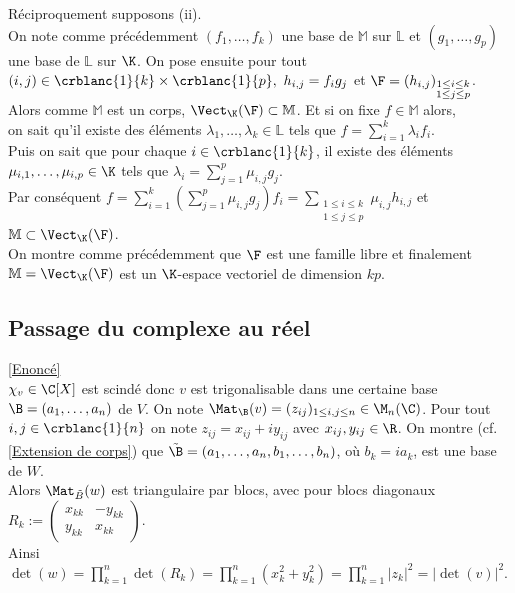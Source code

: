 \documentclass[8pt]{book}
\begin{document}
\begin{enumerate}[leftmargin=*]
		Réciproquement supposons (ii).\\
		On note comme précédemment $(f_1,\dots,f_k)$ une base de $\mathbb M$ sur $\mathbb L$ et $(g_1,\dots,g_p)$ une base de $\mathbb L$ sur $\K$. On pose ensuite pour tout $(i,j)\in \crblanc{1}{k}\times \crblanc{1}{p},\ h_{i,j}=f_ig_j$ et $\F=(h_{i,j})_{\substack{1\leq i\leq k\\1\leq j\leq p}}$. Alors comme $\mathbb M$ est un corps, $\Vect_\K(\F)\subset \mathbb M$. Et si on fixe $f\in \mathbb M$ alors,\\
		on sait qu'il existe des éléments $\lambda_1,\dots,\lambda_k\in \mathbb L$ tels que $f=\displaystyle\sum_{i=1}^k\lambda_if_i$.\\
		Puis on sait que pour chaque $i\in \crblanc{1}{k}$, il existe des éléments $\mu_{i,1},\dots,\mu_{i,p}\in \K$ tels que $\lambda_i=\displaystyle\sum_{j=1}^p\mu_{i,j}g_j$.\\
		Par conséquent $f=\displaystyle\sum_{i=1}^k\left(\sum_{j=1}^p\mu_{i,j}g_j\right)f_i=\sum_{\substack{1\leq i\leq k\\1\leq j\leq p}}\mu_{i,j}h_{i,j}$ et $\mathbb M\subset \Vect_\K(\F)$.\\
		On montre comme précédemment que $\F$ est une famille libre et finalement $\mathbb M=\Vect_\K(\F)$ est un $\K$-espace vectoriel de dimension $kp$.
	\end{enumerate}
	
\subsection{Passage du complexe au réel }
	\textcolor{blue}{\hyperref[Passage du complexe au réel]{[Enoncé]}}\\
	\label{Passage du complexe au réel corrigé}
	$\chi_v\in \C[X]$ est scindé donc $v$ est trigonalisable dans une certaine base $\B=(a_1,\dots,a_n)$ de $V$. On note $\Mat_\B(v)=(z_{ij})_{1\leq i,j\leq n}\in \M_n(\C)$. Pour tout $i,j\in \crblanc{1}{n}$ on note $z_{ij}=x_{ij}+iy_{ij}$ avec $x_{ij},y_{ij}\in \R$. On montre (cf.\ref{Extension de corps}) que $\tilde\B=(a_1,\dots,a_n,b_1,\dots,b_n)$, où $b_k=ia_k$, est une base de $W$.\\
	Alors $\Mat_{\tilde B}(w)$ est triangulaire par blocs, avec pour blocs diagonaux $R_k:=\begin{pmatrix}
		x_{kk}&-y_{kk}\\
		y_{kk}&x_{kk}
	\end{pmatrix}$.\\
	Ainsi $\det(w)=\displaystyle\prod_{k=1}^n\det(R_k)=\prod_{k=1}^n(x_k^2+y_k^2)=\prod_{k=1}^n|z_k|^2=|\det(v)|^2$.
	
\end{document}
